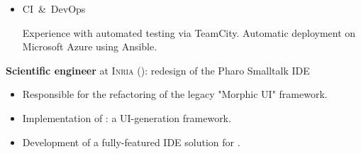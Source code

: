 \begin{rubric}{
}
\begin{itemize}
Backend in \Csharp, using the MVP framework for REST API handling. The server
fetches the data from a CouchDB database. We use NUnit on the server-side for unit testing.

\item CI~\&~DevOps

Experience with automated testing via TeamCity.
Automatic deployment on Microsoft Azure using Ansible.
\end{itemize}






\textbf{Scientific engineer} at \textsc{Inria} (): redesign of the Pharo
Smalltalk IDE

\begin{itemize}
    \item Responsible for the refactoring of the legacy "Morphic UI" framework.
    \item Implementation of : a UI-generation framework.
    \item Development of a fully-featured IDE solution for .
\end{itemize}




\end{rubric}
